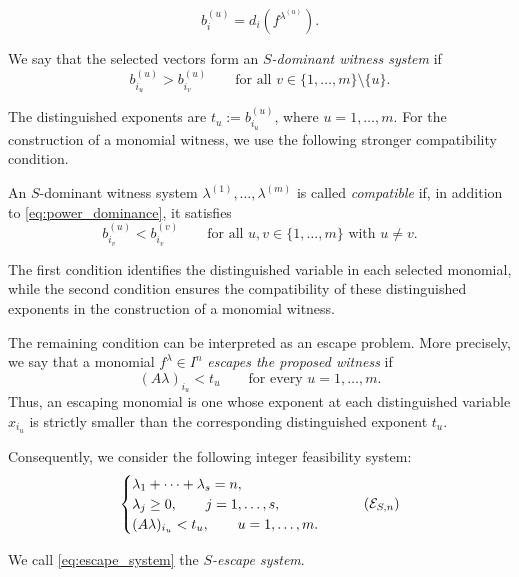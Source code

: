 \documentclass[11pt]{amsart}   %
\begin{document}
$$b^{(u)}_i=d_i(f^{\lambda^{(u)}}).$$


We say that the selected vectors form an
\emph{$S$-dominant witness system} if
\begin{equation}
b^{(u)}_{i_u}>b^{(u)}_{i_v} \qquad \text{for all } v\in\{1,\ldots,m\}\setminus\{u\}.
\label{eq:power_dominance}
\end{equation}

The distinguished exponents are $t_u:=b^{(u)}_{i_u}$, where  $u=1,\ldots,m.$
For the construction of a  monomial witness, we use the
following stronger compatibility condition.



\begin{defn}
\label{def:compatible_witness}
An $S$-dominant witness system $\lambda^{(1)},\ldots,\lambda^{(m)}$
is called \emph{compatible} if, in addition to \eqref{eq:power_dominance}, it satisfies
\begin{equation}
b^{(u)}_{i_v} < b^{(v)}_{i_v}
\qquad \text{for all }u,v\in\{1,\ldots,m\}\text{ with }u\neq v.
\label{eq:cross_dominance}
\end{equation}
\end{defn}
The first condition identifies the distinguished variable in each
selected monomial, while the second condition ensures the compatibility
of these distinguished exponents in the construction of a monomial witness.

The remaining condition can be interpreted as an escape problem.
More precisely, we say that a monomial $f^\lambda\in I^n$ \emph{escapes
the proposed witness} if
\[
(A\lambda)_{i_u}<t_u
\qquad
\text{for every }u=1,\ldots,m.
\]
Thus, an escaping monomial is one whose exponent at each distinguished
variable $x_{i_u}$ is strictly smaller than the corresponding
distinguished exponent $t_u$.

Consequently, we consider the following integer feasibility system:
\begin{equation}
\begin{cases}
\lambda_1+\cdots+\lambda_s=n,\\
\lambda_j\geq0,\qquad j=1,\ldots,s,\\
(A\lambda)_{i_u}<t_u,\qquad u=1,\ldots,m.
\end{cases}
\tag{$\mathcal E_{S,n}$}
\label{eq:escape_system}
\end{equation}

We call \eqref{eq:escape_system} the
\emph{$S$-escape system}.

\end{document}
